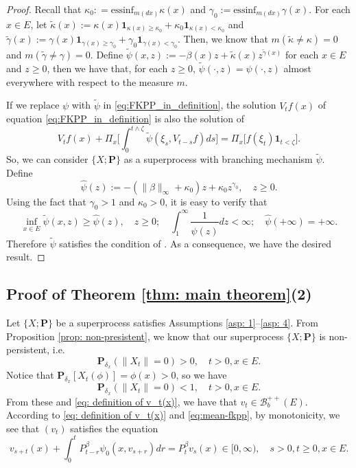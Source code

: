 \documentclass[12pt, a4paper]{amsart}
\theoremstyle{definition}
\numberwithin{equation}{section}
\begin{document}
\begin{proof}
      Recall that $\kappa_0 : = \text{essinf}_{m(dx)} \kappa(x) $ and $\gamma_0 := \text{essinf}_{m(dx)} \gamma(x)$.
For each $x\in E$, let $\tilde \kappa(x) := \kappa(x) \mathbf 1_{\kappa(x)\geq \kappa_0} + \kappa_0 \mathbf 1_{\kappa(x) < \kappa_0}$ and $\tilde \gamma(x) := \gamma(x) \mathbf 1_{\gamma(x)\geq \gamma_0} + \gamma_0 \mathbf 1_{\gamma(x) < \gamma_0}$.
    Then, we know that $m(\tilde \kappa \neq \kappa) = 0$ and $m(\tilde \gamma \neq \gamma) = 0$.
	Define $\widetilde \psi(x,z) := - \beta(x)z+ \tilde \kappa(x)z^{\tilde \gamma(x)}$ for each $x\in E$ and $z\geq 0$, then we have that, for each $z\geq 0$, $\widetilde \psi(\cdot, z) = \psi(\cdot , z) $ almost everywhere with respect to the measure $m$.

	If we replace $\psi$ with $\tilde\psi$ in \eqref{eq:FKPP_in_definition}, the solution $V_tf(x)$ of equation \eqref{eq:FKPP_in_definition} is also the solution of
\[
	V_t f(x) + \Pi_x \Big[  \int_0^{t\wedge \zeta} \widetilde \psi (\xi_s,V_{t-s} f) ds \Big]
	=\Pi_x \big[ f(\xi_t)\mathbf 1_{t<\zeta} \big].
\]
	So, we can consider
	$\{X; \mathbf P\}$ as a superprocess with branching mechanism $\tilde \psi$.
	Define
\[
	\widehat\psi(z)
	:= - (\|\beta\|_\infty +\kappa_0 )z + \kappa_0 z^{\gamma_0},
	\quad z\geq 0.
\]
	Using the fact that $\gamma_0 > 1$ and $\kappa_0 > 0$, it is easy to verify that
\[
	\inf_{x\in E}\widetilde \psi(x,z)
	\geq \hat\psi(z),
	\quad z\geq 0;
	\quad \int_1^\infty \frac{1}{\widehat\psi(z)} dz
	< \infty;
	\quad \hat \psi(+\infty) = +\infty.
\]
	Therefore $\widetilde \psi$ satisfies the condition of \cite[Lemma 2.3]{RenSongZhang2015Limit}.
	As a consequence,
	we have the desired result.
\end{proof}

\subsection{Proof of Theorem \ref{thm: main theorem}(2)}
\label{sec: proof of result 2}
	Let $\{X; \mathbf P\}$ be a superprocess satisfies
	Assumptions \ref{asp: 1}--\ref{asp: 4}.
	From Proposition \ref{prop: non-presistent}, we know that our superprocess $\{X;\mathbf P\}$ is non-persistent,
    i.e.
\[
    \mathbf P_{\delta_x}(\|X_t\| = 0)
    > 0,
    \quad t>0, x \in E.
\]
	Notice that $\mathbf P_{\delta_x}[X_t(\phi)] = \phi(x)>0$, so we have
\[
    \mathbf P_{\delta_x}(\|X_t\|= 0)<1,
    \quad t>0, x \in E.
\]
	From these and \eqref{eq: definition of v_t(x)}, we have that $v_t \in \mathscr B^{++}_b(E)$.
	According to \eqref{eq: definition of v_t(x)} and \eqref{eq:mean-fkpp},
	by monotonicity, we see that $(v_t)$ satisfies the equation
\[
	v_{s+t}(x) + \int_0^t P^\beta_{t-r} \psi_0(x,v_{s+r}) dr
	= P^\beta_t v_s(x)
	\in [0,\infty),
	\quad s>0, t \geq 0,x \in E.
\]
\end{document}
